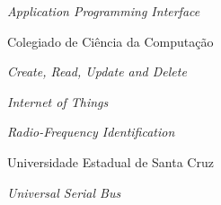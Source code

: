 \begin{siglas}

\item[API] \textit{Application Programming Interface}
\item[COLCIC] Colegiado de Ciência da Computação
\item[CRUD] \textit{Create, Read, Update and Delete}
\item[IoT] \textit{Internet of Things}
\item[RFID] \textit{Radio-Frequency Identification}
\item[UESC] Universidade Estadual de Santa Cruz
\item[USB] \textit{Universal Serial Bus}

\end{siglas}
